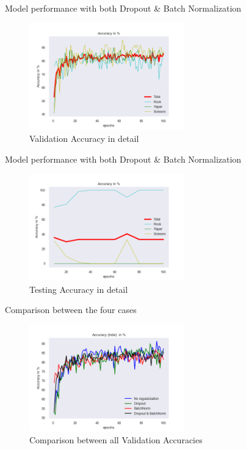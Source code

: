 \documentclass[aspectratio=169]{beamer}
\begin{document}
{    \begin{frame}{Model performance with both Dropout \& Batch Normalization}
        \begin{figure}
            \centering
            \includegraphics[width=0.6\textwidth]{img/baptiste_100epoches_accuracy__Dropouts_True__BatchNorm_True.png}
            \caption{Validation Accuracy in detail}
        \end{figure}
    \end{frame}

    \begin{frame}{Model performance with both Dropout \& Batch Normalization}
        \begin{figure}
            \centering
            \includegraphics[width=0.6\textwidth]{img/baptiste_100_epoches_test_accuracy__Dropouts_True__BatchNorm_True.png}
            \caption{Testing Accuracy in detail}
        \end{figure}
    \end{frame}
    

    \begin{frame}{Comparison between the four cases}
        \begin{figure}
            \centering
            \includegraphics[width=0.6\textwidth]{img/baptiste_val_accuracies_comparison.png}
            \caption{Comparison between all Validation Accuracies}
        \end{figure}
    \end{frame}


}
\end{document}
